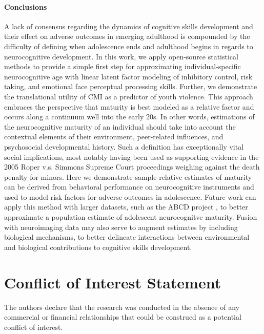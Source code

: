 \documentclass{article}%
\begin{document}
\paragraph*{Conclusions} A lack of consensus regarding the dynamics of cognitive skills development and their effect on adverse outcomes in emerging adulthood is compounded by the difficulty of defining when adolescence ends and adulthood begins in regards to neurocognitive development. In this work, we apply open-source statistical methods to provide a simple first step for approximating individual-specific neurocognitive age with linear latent factor modeling of inhibitory control, risk taking, and emotional face perceptual processing skills. Further, we demonstrate the translational utility of CMI as a predictor of youth violence. This approach embraces the perspective that maturity is best modeled as a relative factor and occurs along a continuum well into the early 20s. In other words, estimations of the neurocognitive maturity of an individual should take into account the contextual elements of their environment, peer-related influences, and psychosocial developmental history. Such a definition has exceptionally vital social implications, most notably having been used as supporting evidence in the 2005 Roper v.s. Simmons Supreme Court proceedings weighing against the death penalty for minors. Here we demonstrate sample-relative estimates of maturity can be derived from behavioral performance on neurocognitive instruments and used to model risk factors for adverse outcomes in adolescence. Future work can apply this method with larger datasets, such as the ABCD project \citep{casey2018adolescent,volkow2018conception}, to better approximate a population estimate of adolescent neurocognitve maturity. Fusion with neuroimaging data may also serve to augment estimates by including biological mechanisms, to better delineate interactions between environmental and biological contributions to cognitive skills development.

\section*{Conflict of Interest Statement}
The authors declare that the research was conducted in the absence of any commercial or financial relationships that could be construed as a potential conflict of interest.
\end{document}
